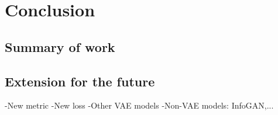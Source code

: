 \chapter{Conclusion} \label{ch:conclusion}

    \section{Summary of work}
    \section{Extension for the future}
        -New metric
        -New loss
        -Other VAE models
        -Non-VAE models: InfoGAN,...
